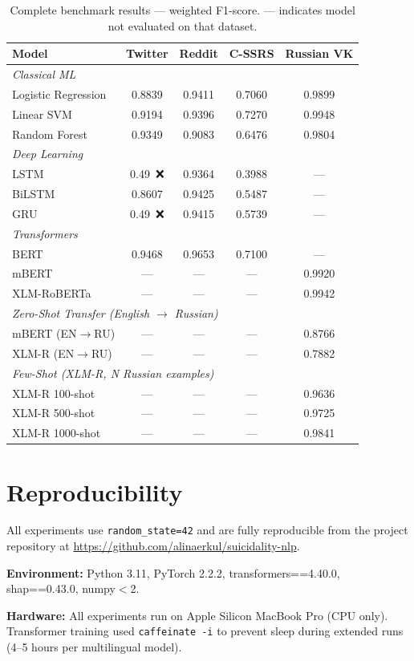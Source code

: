 \documentclass[12pt, a4paper, oneside]{report}
\begin{document}
\begin{table}[H]
\centering
\caption{Complete benchmark results — weighted F1-score. --- indicates model not evaluated on that dataset.}
\begin{tabular}{lcccc}
\toprule
\textbf{Model} & \textbf{Twitter} & \textbf{Reddit} & \textbf{C-SSRS} & \textbf{Russian VK} \\
\midrule
\multicolumn{5}{l}{\textit{Classical ML}} \\
Logistic Regression  & 0.8839 & 0.9411 & 0.7060 & 0.9899 \\
Linear SVM           & 0.9194 & 0.9396 & 0.7270 & 0.9948 \\
Random Forest        & 0.9349 & 0.9083 & 0.6476 & 0.9804 \\
\midrule
\multicolumn{5}{l}{\textit{Deep Learning}} \\
LSTM                 & 0.49~❌ & 0.9364 & 0.3988 & --- \\
BiLSTM               & 0.8607 & 0.9425 & 0.5487 & --- \\
GRU                  & 0.49~❌ & 0.9415 & 0.5739 & --- \\
\midrule
\multicolumn{5}{l}{\textit{Transformers}} \\
BERT                 & 0.9468 & 0.9653 & 0.7100 & --- \\
mBERT                & ---    & ---    & ---    & 0.9920 \\
XLM-RoBERTa          & ---    & ---    & ---    & 0.9942 \\
\midrule
\multicolumn{5}{l}{\textit{Zero-Shot Transfer (English $\rightarrow$ Russian)}} \\
mBERT (EN$\rightarrow$RU)  & --- & --- & ---   & 0.8766 \\
XLM-R (EN$\rightarrow$RU)  & --- & --- & ---   & 0.7882 \\
\midrule
\multicolumn{5}{l}{\textit{Few-Shot (XLM-R, N Russian examples)}} \\
XLM-R 100-shot             & --- & --- & ---   & 0.9636 \\
XLM-R 500-shot             & --- & --- & ---   & 0.9725 \\
XLM-R 1000-shot            & --- & --- & ---   & 0.9841 \\
\bottomrule
\end{tabular}
\end{table}

\chapter{Reproducibility}
\label{app:repro}

All experiments use \texttt{random\_state=42} and are fully reproducible from the project repository at \url{https://github.com/alinaerkul/suicidality-nlp}.

\textbf{Environment:} Python 3.11, PyTorch 2.2.2, transformers==4.40.0, shap==0.43.0, numpy$<$2.

\textbf{Hardware:} All experiments run on Apple Silicon MacBook Pro (CPU only). Transformer training used \texttt{caffeinate -i} to prevent sleep during extended runs (4--5 hours per multilingual model).
\end{document}
